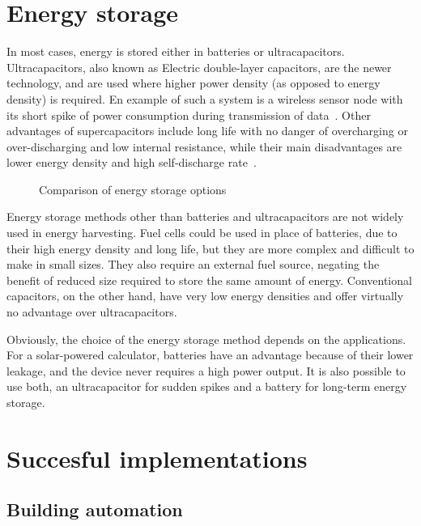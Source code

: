 \documentclass[a4paper,10pt]{article}
\begin{document}
\section{Energy storage}

In most cases, energy is stored either in batteries or ultracapacitors. Ultracapacitors, also known as Electric double-layer capacitors, are the newer technology, and are used where higher power density (as opposed to energy density) is required. En example of such a system is a wireless sensor node with its short spike of power consumption during transmission of data~\cite{cap-wsn-ieee}. Other advantages of supercapacitors include long life with no danger of overcharging or over-discharging and low internal resistance, while their main disadvantages are lower energy density and high self-discharge rate~\cite{wiki:edlc}. 

\begin{figure}[!h]
\def\svgwidth{0.8\textwidth}
 
\caption{Comparison of energy storage options~\cite{wiki:edlc}}
\label{fig:storage-chart}
\end{figure}

Energy storage methods other than batteries and ultracapacitors are not widely used in energy harvesting. Fuel cells could be used in place of batteries, due to their high energy density and long life, but they are more complex and difficult to make in small sizes. They also require an external fuel source, negating the benefit of reduced size required to store the same amount of energy. Conventional capacitors, on the other hand, have very low energy densities and offer virtually no advantage over ultracapacitors. 

Obviously, the choice of the energy storage method depends on the applications. For a solar-powered calculator, batteries have an advantage because of their lower leakage, and the device never requires a high power output. It is also possible to use both, an ultracapacitor for sudden spikes and a battery for long-term energy storage. 

\section{Succesful implementations}

\subsection{Building automation}
\end{document}
